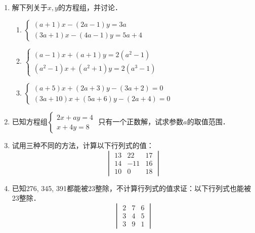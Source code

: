 \begin{enumerate}
\item 解下列关于$x,y$的方程组，并讨论．
\begin{enumerate}
    \item $\begin{cases}
        (a+1)x-(2a-1)y=3a\\(3a+1)x-(4a-1)y=5a+4
    \end{cases}$
    \item $\begin{cases}
        (a-1)x+(a+1)y=2(a^2-1)\\(a^2-1)x+(a^2+1)y=2(a^3-1)
    \end{cases}$
    \item $\begin{cases}
        (a+5)x+(2a+3)y-(3a+2)=0\\(3a+10)x+(5a+6)y-(2a+4)=0
    \end{cases}$
\end{enumerate}

\item 已知方程组$\begin{cases}
    2x+ay=4\\x+4y=8
\end{cases}$
只有一个正数解，试求参数$a$的取值范围．

\item 试用三种不同的方法，计算以下行列式的值：
\[\begin{vmatrix}
    13&22&17\\14&-11&16\\10&0&18
\end{vmatrix}\]

\item 已知276, 345, 391都能被23整除，不计算行列式的值求证：以下行列式也能被23整除．
\[\begin{vmatrix}
    2&7&6\\3&4&5\\3&9&1
\end{vmatrix}\]


\end{enumerate}
